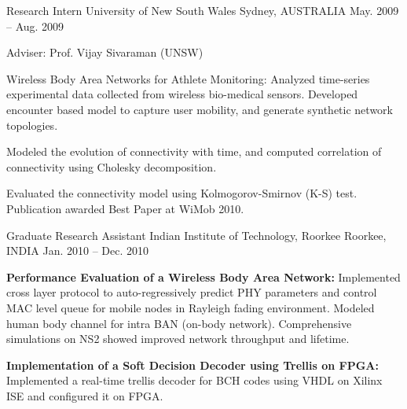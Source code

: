\begin{cventries}
  \cventry
    {Research Intern} %
    {University of New South Wales} %
    {Sydney, AUSTRALIA} %
    {May. 2009 -- Aug. 2009} %
    {
      \begin{cvitems} %
      \item {Adviser: Prof. Vijay Sivaraman (UNSW)}
%      
      \item {Wireless Body Area Networks for Athlete Monitoring: Analyzed time-series experimental data collected from wireless bio-medical sensors. Developed encounter based model to capture user mobility, and generate synthetic network topologies.
      		}
      \item {Modeled the evolution of connectivity with time, and computed correlation of connectivity using Cholesky decomposition.}
      \item {Evaluated the connectivity model using Kolmogorov-Smirnov (K-S) test. Publication awarded Best Paper at WiMob 2010.}
    \end{cvitems}
    }

  \cventry
    {Graduate Research Assistant} %
    {Indian Institute of Technology, Roorkee} %
    {Roorkee, INDIA} %
    {Jan. 2010 -- Dec. 2010} %
    {
      \begin{cvitems} %
      \item {\textbf{Performance Evaluation of a Wireless Body Area Network:} Implemented cross layer protocol to auto-regressively predict PHY parameters and control MAC level queue for mobile nodes in Rayleigh fading environment. Modeled human body channel for intra BAN (on-body network). Comprehensive simulations on NS2 showed improved network throughput and lifetime.
      		}
      \item {\textbf{Implementation of a Soft Decision Decoder using Trellis on FPGA:} Implemented a real-time trellis decoder for BCH codes using VHDL on Xilinx ISE and configured it on FPGA.}
    \end{cvitems}
    }
    
\end{cventries}

